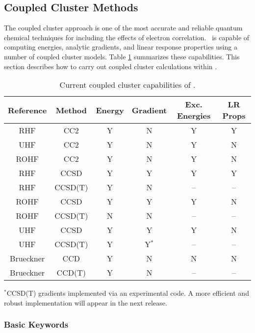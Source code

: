 \subsection{Coupled Cluster Methods} \label{sec:cc}

The coupled cluster approach is one of the most accurate and reliable quantum
chemical techniques for including the effects of electron correlation.
\PSIthree\ is capable of computing energies, analytic gradients, and
linear response properties using a number of coupled cluster models.
Table \ref{table:ccsummary} summarizes these capabilities.  This section
describes how to carry out coupled cluster calculations within \PSIthree.
\begin{table}[h]
\begin{center}
\caption{Current coupled cluster capabilities of \PSIthree.}
\label{table:ccsummary}
\begin{tabular}{cccccc}
\hline
\hline
Reference & Method & Energy    & Gradient  &  Exc. Energies & LR Props \\
\hline
RHF       & CC2     & Y & N & Y & Y  \\
UHF       & CC2     & Y & N & Y & N  \\
ROHF      & CC2     & Y & N & Y & N  \\
RHF       & CCSD    & Y & Y & Y & Y  \\
RHF       & CCSD(T) & Y & N & --& -- \\
ROHF      & CCSD    & Y & Y & Y & N  \\
ROHF      & CCSD(T) & N & N & --& -- \\
UHF       & CCSD    & Y & Y & Y & N  \\
UHF       & CCSD(T) & Y & Y$^*$ & --& -- \\
Brueckner & CCD     & Y & N & N & N  \\
Brueckner & CCD(T)  & Y & N & --& -- \\
\hline
\hline
\end{tabular}
\end{center}
{\footnotesize $^*$CCSD(T) gradients implemented via an experimental code.
A more efficient and robust implementation will appear in the next
release.}
\end{table}

\subsubsection{Basic Keywords}

